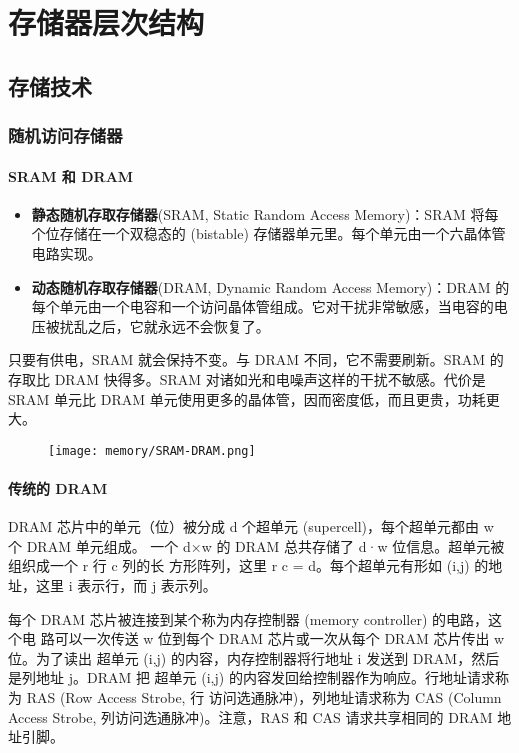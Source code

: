 \section{存储器层次结构}
\subsection{存储技术}
\subsubsection{随机访问存储器}

\paragraph{SRAM 和 DRAM}
\begin{itemize}
    \item \textbf{静态随机存取存储器}(SRAM, Static Random Access Memory)：SRAM 将每个位存储在一个双稳态的 (bistable) 存储器单元里。每个单元由一个六晶体管电路实现。
    \item \textbf{动态随机存取存储器}(DRAM, Dynamic Random Access Memory)：DRAM 的每个单元由一个电容和一个访问晶体管组成。它对干扰非常敏感，当电容的电压被扰乱之后，它就永远不会恢复了。
\end{itemize}

只要有供电，SRAM 就会保持不变。与 DRAM 不同，它不需要刷新。SRAM 的存取比 DRAM 快得多。SRAM 对诸如光和电噪声这样的干扰不敏感。代价是 SRAM 单元比 DRAM 单元使用更多的晶体管，因而密度低，而且更贵，功耗更大。
\begin{figure}[H]
    \centering
    \texttt{[image: memory/SRAM-DRAM.png]}
\end{figure}

\paragraph{传统的 DRAM}

DRAM 芯片中的单元（位）被分成 d 个超单元 (supercell)，每个超单元都由 w 个 DRAM
单元组成。 一个 d×w 的 DRAM 总共存储了 d·w 位信息。超单元被组织成一个 r 行 c 列的长
方形阵列，这里 r c = d。每个超单元有形如 (i,j) 的地址，这里 i 表示行，而 j 表示列。

每个 DRAM 芯片被连接到某个称为内存控制器 (memory controller) 的电路，这个电
路可以一次传送 w 位到每个 DRAM 芯片或一次从每个 DRAM 芯片传出 w 位。为了读出
超单元 (i,j) 的内容，内存控制器将行地址 i 发送到 DRAM，然后是列地址 j。DRAM 把
超单元 (i,j) 的内容发回给控制器作为响应。行地址请求称为 RAS (Row Access Strobe, 行
访问选通脉冲)，列地址请求称为 CAS (Column Access Strobe, 列访问选通脉冲)。注意，RAS
和 CAS 请求共享相同的 DRAM 地址引脚。

